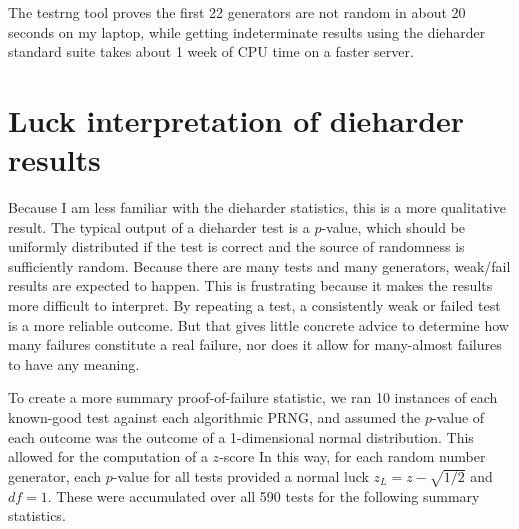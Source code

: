 The testrng tool proves the first 22 generators are not random in about 20 seconds on my laptop, while getting indeterminate results using the dieharder standard suite takes about 1 week of CPU time on a faster server.

\section{Luck interpretation of dieharder results}
Because I am less familiar with the dieharder statistics, this is a more qualitative result.  The typical output of a dieharder test is a $p$-value, which should be uniformly distributed if the test is correct and the source of randomness is sufficiently random.  Because there are many tests and many generators, weak/fail results are expected to happen.  This is frustrating because it makes the results more difficult to interpret.  By repeating a test, a consistently weak or failed test is a more reliable outcome.  But that gives little concrete advice to determine how many failures constitute a real failure, nor does it allow for many-almost failures to have any meaning.

To create a more summary proof-of-failure statistic, we ran 10 instances of each known-good test against each algorithmic PRNG, and assumed the $p$-value of each outcome was the outcome of a 1-dimensional normal distribution.  This  allowed for the computation of a $z$-score  In this way, for each random number generator, each $p$-value for all tests provided a normal luck $z_L=z-\sqrt{1/2}$ and $df=1$. These were accumulated over all 590 tests for the following summary statistics.

